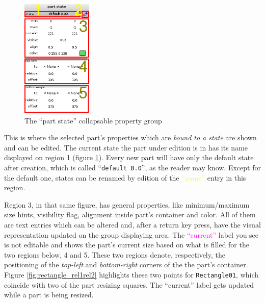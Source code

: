\documentclass[a4paper]{profusion}
\newcommand{\GUILabel}[1]{\textcolor{magenta}{#1}}
\newcommand{\GUIEditable}[1]{\textcolor{yellow}{#1}} %
\begin{document}
\begin{figure}[h!]
  \centering
  \includegraphics[width=0.3\textwidth]{images/part_state_group.png}
  \caption{The ``part state'' collapsable property group}
  \label{fig:part_state_group}
\end{figure}

This is where the selected part's properties which are \emph{bound to
  a state} are shown and can be edited. The current state the part
under edition is in has its name displayed on region 1 (figure
\ref{fig:part_state_group}). Every new part will have only the default
state after creation, which is called ``\texttt{default 0.0}'', as the
reader may know. Except for the default one, states can be renamed by
edition of the \GUIEditable{``name''} entry in this region.

Region 3, in that same figure, has general properties, like
minimum/maximum size hints, visibility flag, alignment inside part's
container and color. All of them are text entries which can be altered
and, after a return key press, have the visual representation updated
on the group displaying area. The \GUILabel{``current''} label you see
is not editable and shows the part's current size based on what is
filled for the two regions below, 4 and 5. These two regions denote,
respectively, the positioning of the \emph{top-left} and
\emph{bottom-right} corners of the the part's container. Figure
\ref{fig:rectangle_rel1rel2} highlights these two points for
\texttt{Rectangle01}, which coincide with two of the part resizing
squares. The ``current'' label gets updated while a part is being
resized.
\end{document}

